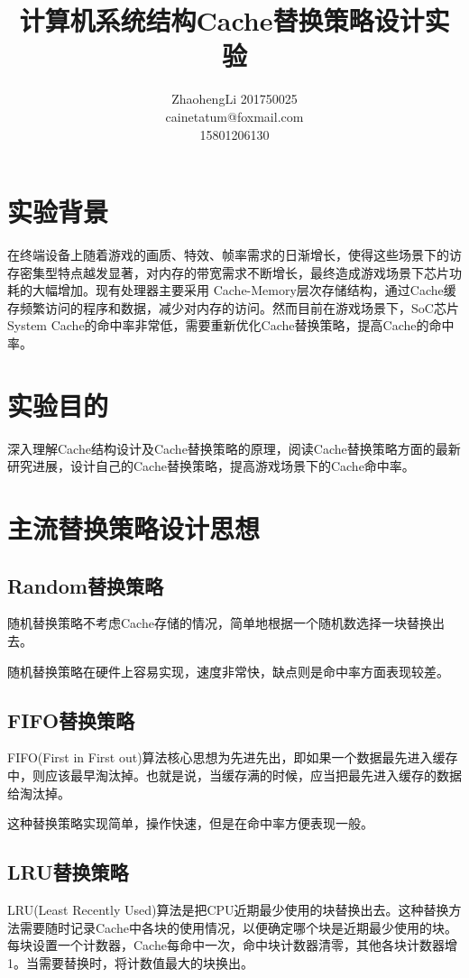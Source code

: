 \documentclass{article}
\title{计算机系统结构Cache替换策略设计实验}
\author{ZhaohengLi 201750025\\cainetatum@foxmail.com\\15801206130}
\begin{document}
\maketitle
\newpage
\tableofcontents
\newpage
\section{实验背景}
在终端设备上随着游戏的画质、特效、帧率需求的日渐增长，使得这些场景下的访存密集型特点越发显著，对内存的带宽需求不断增长，最终造成游戏场景下芯片功耗的大幅增加。现有处理器主要采用 Cache-Memory层次存储结构，通过Cache缓存频繁访问的程序和数据，减少对内存的访问。然而目前在游戏场景下，SoC芯片System Cache的命中率非常低，需要重新优化Cache替换策略，提高Cache的命中率。

\section{实验目的}
深入理解Cache结构设计及Cache替换策略的原理，阅读Cache替换策略方面的最新研究进展，设计自己的Cache替换策略，提高游戏场景下的Cache命中率。

\section{主流替换策略设计思想}

\subsection{Random替换策略}
随机替换策略不考虑Cache存储的情况，简单地根据一个随机数选择一块替换出去。

随机替换策略在硬件上容易实现，速度非常快，缺点则是命中率方面表现较差。

\subsection{FIFO替换策略}
FIFO(First in First out)算法核心思想为先进先出，即如果一个数据最先进入缓存中，则应该最早淘汰掉。也就是说，当缓存满的时候，应当把最先进入缓存的数据给淘汰掉。

这种替换策略实现简单，操作快速，但是在命中率方便表现一般。

\subsection{LRU替换策略}
LRU(Least Recently Used)算法是把CPU近期最少使用的块替换出去。这种替换方法需要随时记录Cache中各块的使用情况，以便确定哪个块是近期最少使用的块。每块设置一个计数器，Cache每命中一次，命中块计数器清零，其他各块计数器增1。当需要替换时，将计数值最大的块换出。
\end{document}
